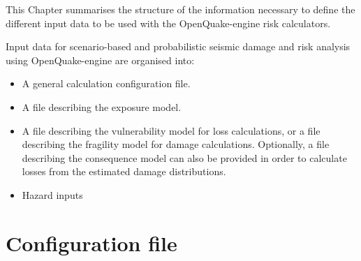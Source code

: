 This Chapter summarises the structure of the information necessary to define
the different input data to be used with the OpenQuake-engine risk 
calculators.

Input data for scenario-based and probabilistic seismic damage and risk
analysis using OpenQuake-engine are organised into:

\begin{itemize}

  \item A general calculation configuration file.

  \item A file describing the exposure model.

  \item A file describing the vulnerability model for loss calculations, or a 
  		file describing the fragility model for damage calculations. Optionally, 
  		a file describing the consequence model can also be provided in order 
  		to calculate losses from the estimated damage distributions.

  \item Hazard inputs

\end{itemize}



% 

\section{Configuration file}
\label{sec:risk_configuration_file}
